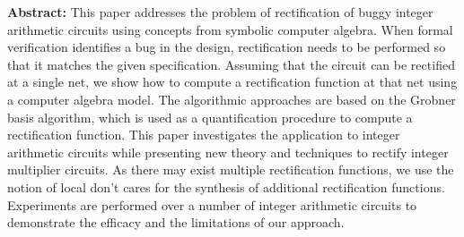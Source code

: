 {\bf Abstract:} This paper addresses the problem of rectification of buggy integer arithmetic circuits using concepts from symbolic computer algebra. When formal verification identifies a bug in the design, rectification needs to be performed so that it matches the given specification. Assuming that the circuit can be rectified at a single net, we show how to compute a rectification function at that net using a computer algebra model. The algorithmic approaches are based on the Grobner basis algorithm, which is used as a quantification procedure to compute a rectification function. This paper investigates the application to integer arithmetic circuits while presenting new theory and techniques to rectify integer multiplier circuits. As there may exist multiple rectification functions, we use the notion of local don’t cares for the synthesis of additional rectification functions. Experiments are performed over a number of integer arithmetic circuits to demonstrate the efficacy and the limitations of our approach.